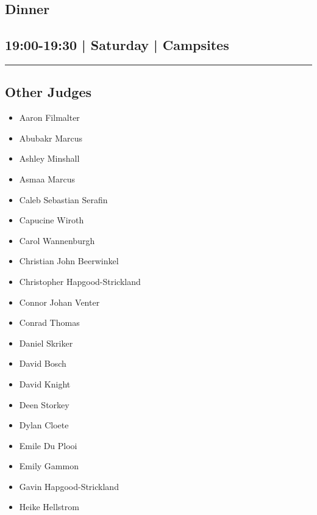 \documentclass[10pt, A5]{article}
\begin{document}
        \begin{framed}
        \begin{minipage}{\textwidth}

        \setcounter{section}{38}
        \section{Dinner}
        \subsection*{19:00-19:30 | Saturday | Campsites}

        \vspace{0.25cm}
        \hrule
        \vspace{0.25cm}


        \subsection*{Other Judges}
                    

        	\begin{multicols}{2}

		\begin{itemize}
									\item Aaron Filmalter
									\item Abubakr Marcus
									\item Ashley Minshall
									\item Asmaa Marcus
									\item Caleb Sebastian Serafin
									\item Capucine Wiroth
									\item Carol Wannenburgh
									\item Christian John Beerwinkel
									\item Christopher Hapgood-Strickland
									\item Connor Johan Venter
									\item Conrad Thomas
									\item Daniel Skriker
									\item David Bosch
									\item David Knight
									\item Deen Storkey
									\item Dylan Cloete
									\item Emile Du Plooi
									\item Emily Gammon
									\item Gavin Hapgood-Strickland
									\item Heike Hellstrom
						\end{itemize}


\end{multicols}
\end{minipage}
\end{framed}
\end{document}
